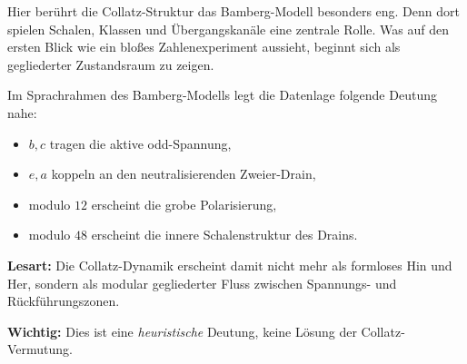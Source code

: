 \documentclass[12pt,a4paper]{article}
\begin{document}
\noindent
Hier berührt die Collatz-Struktur das Bamberg-Modell besonders eng. Denn dort spielen Schalen, Klassen und Übergangskanäle eine zentrale Rolle. Was auf den ersten Blick wie ein bloßes Zahlenexperiment aussieht, beginnt sich als gegliederter Zustandsraum zu zeigen.

\begin{tcolorbox}[
colback=purple!4,
colframe=purple!55!black,
title=\textbf{5. Bamberg-Lesart: Spannung, Drain und diskreter Fluss}
]
Im Sprachrahmen des Bamberg-Modells legt die Datenlage folgende Deutung nahe:

\begin{itemize}[leftmargin=1.5em]
\item \(b,c\) tragen die aktive odd-Spannung,
\item \(e,a\) koppeln an den neutralisierenden Zweier-Drain,
\item modulo \(12\) erscheint die grobe Polarisierung,
\item modulo \(48\) erscheint die innere Schalenstruktur des Drains.
\end{itemize}

\medskip
\textbf{Lesart:}
Die Collatz-Dynamik erscheint damit nicht mehr als formloses Hin und Her, sondern als modular gegliederter Fluss zwischen Spannungs- und Rückführungszonen.

\medskip
\textbf{Wichtig:}
Dies ist eine \emph{heuristische} Deutung, keine Lösung der Collatz-Vermutung.
\end{tcolorbox}
\end{document}
